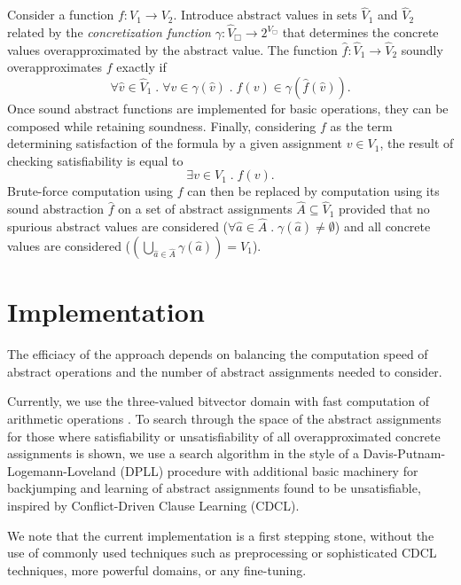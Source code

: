 \documentclass[conference]{IEEEtran}
\begin{document}
Consider a function $f: V_1 \rightarrow V_2$. Introduce abstract values in sets $\hat{V}_1$ and $\hat{V}_2$
related by the \textit{concretization function} $\gamma: \hat{V}_\Box \rightarrow 2^{V_\Box}$
that determines the concrete values overapproximated by the abstract value.
The function $\hat{f}: \hat{V}_1 \rightarrow \hat{V}_2$ soundly overapproximates $f$ exactly if
\begin{equation}
  \forall \hat{v} \in \hat{V}_1 \; . \; \forall v \in \gamma(\hat{v}) \; . \;
  f(v) \in \gamma(\hat{f}(\hat{v})).
\end{equation}
Once sound abstract functions are implemented for basic operations,
they can be composed while retaining soundness. Finally, considering $f$ as the
term determining satisfaction of the formula by a given assignment $v \in V_1$,
the result of checking satisfiability is equal to
\begin{equation}
  \exists v \in V_1 \; . \; f(v).
\end{equation}
Brute-force computation using $f$ can then be replaced by computation using its sound abstraction $\hat{f}$
on a set of abstract assignments $\hat{A} \subseteq \hat{V}_1$
provided that no spurious abstract values are considered
($\forall \hat{a} \in \hat{A} \; . \; \gamma(\hat{a}) \neq \emptyset$)
and all concrete values are considered
($\left(\bigcup_{\hat{a} \in \hat{A}} \gamma(\hat{a})\right) = V_1$).

\section{Implementation}

The efficiacy of the approach depends on balancing the computation speed of abstract operations
and the number of abstract assignments needed to consider.

Currently, we use the three-valued bitvector domain
with fast computation of arithmetic operations \cite{onderka2022}.
To search through the space of the abstract assignments for those where satisfiability
or unsatisfiability of all overapproximated concrete assignments is shown,
we use a search algorithm in the style of a Davis-Putnam-Logemann-Loveland (DPLL)
procedure with additional basic machinery for backjumping and learning of abstract assignments
found to be unsatisfiable, inspired by Conflict-Driven Clause Learning (CDCL).

We note that the current implementation is a first stepping stone, without the use of commonly used
techniques such as preprocessing or sophisticated CDCL techniques, more powerful domains,
or any fine-tuning.



\end{document}
